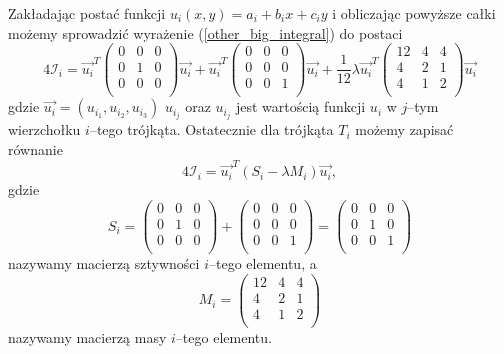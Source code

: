 \documentclass{classrep}
\begin{document}
Zakładając postać funkcji $u_i(x, y) = a_i + b_i x + c_i y$ i obliczając powyższe całki możemy sprowadzić wyrażenie (\ref{other_big_integral}) do postaci 
\begin{equation}
4\mathcal{I}_i = \Vec{u_i}^T
\begin{pmatrix}
0 & 0 & 0 \\
0 & 1 & 0 \\
0 & 0 & 0 \\
\end{pmatrix} 
\Vec{u_i} + \Vec{u_i}^T
\begin{pmatrix}
0 & 0 & 0 \\
0 & 0 & 0 \\
0 & 0 & 1 \\
\end{pmatrix}
\Vec{u_i} + \frac{1}{12}\lambda\Vec{u_i}^T
\begin{pmatrix}
12& 4 & 4 \\
4 & 2 & 1 \\
4 & 1 & 2 \\
\end{pmatrix}
\Vec{u_i}
\end{equation}
gdzie $\Vec{u_i} = (u_{i_1}, u_{i_2}, u_{i_3})$ $u_{i_j}$ oraz $u_{i_j}$ jest wartością funkcji $u_i$ w $j$--tym wierzchołku $i$--tego trójkąta.
Ostatecznie dla trójkąta $T_i$ możemy zapisać równanie
\begin{equation}
4\mathcal{I}_i = \Vec{u_i}^T (S_i - \lambda M_i) \Vec{u_i},
\end{equation}
gdzie 
\begin{equation}
S_i = 
\begin{pmatrix}
0 & 0 & 0 \\
0 & 1 & 0 \\
0 & 0 & 0 \\
\end{pmatrix}
+
\begin{pmatrix}
0 & 0 & 0 \\
0 & 0 & 0 \\
0 & 0 & 1 \\
\end{pmatrix}
=
\begin{pmatrix}
0 & 0 & 0 \\
0 & 1 & 0 \\
0 & 0 & 1 \\
\end{pmatrix}
\end{equation} nazywamy macierzą sztywności $i$--tego elementu, a 
\begin{equation}
M_i = 
\begin{pmatrix}
12& 4 & 4 \\
4 & 2 & 1 \\
4 & 1 & 2 \\
\end{pmatrix}
\end{equation}
nazywamy macierzą masy $i$--tego elementu.
\end{document}
